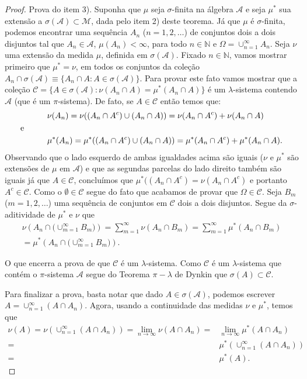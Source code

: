 \begin{proof}
Prova do item 3). 
Suponha que $ \mu$ seja $\sigma$-finita 
na álgebra $\mathcal{A}$ e seja
$\mu^*$ sua extensão a $\sigma(\mathcal{A}) \subset \mathcal{M}$, 
dada pelo item 2) deste teorema. Já que $\mu$ é $\sigma$-finita, podemos
encontrar uma sequência $A_n$ ($n=1,2,\ldots$) de conjuntos
dois a dois disjuntos tal que 
$A_n\in \mathcal{A}$, $\mu(A_n)<\infty$, para todo $n\in\mathbb{N}$ e 
$\Omega = \cup_{n=1}^{\infty} A_n$. 
Seja $\nu$ uma extensão da medida $\mu$, definida em $\sigma(\mathcal{A})$.
Fixado $n\in\mathbb{N}$, vamos mostrar primeiro que $\mu^{*} = \nu$, 
em todos os conjuntos da coleção 
$
A_n\cap \sigma(\mathcal{A}) \equiv \{ A_n\cap A: A\in\sigma(\mathcal{A})\}.
$
Para provar este fato vamos mostrar que a coleção 
$
\mathcal{C} = \{ A\in \sigma(\mathcal{A}) : \nu(A_n\cap A) = \mu^*(A_n\cap A)\}
$
é um $\lambda$-sistema contendo $\mathcal{A}$ (que é um $\pi$-sistema). 
De fato, se $A \in\mathcal{C}$ então temos que: 
\begin{align*}
	&\nu(A_n) =
	\nu((A_n\cap A^c) \cup (A_n\cap A)) 
	= 
	\nu(A_n\cap A^c)+ \nu(A_n\cap A)
\\
\text{e}\hspace*{1cm}&
\\
	&\mu^*(A_n) =
	\mu^*((A_n\cap A^c) \cup (A_n\cap A)) 
	= 
	\mu^*(A_n\cap A^c)+ \mu^*(A_n\cap A).
\end{align*}
Observando que o lado esquerdo de ambas igualdades acima são iguais
($\nu$ e $\mu^*$ são extensões de $\mu$ em $\mathcal{A}$) 
e que as segundas parcelas do lado direito também são iguais 
já que $A\in\mathcal{C}$, concluímos que $\mu^*((A_n\cap A^c)= \nu(A_n\cap A^c)$ 
e portanto $A^c\in\mathcal{C}$. 
Como o $\emptyset\in\mathcal{C}$ segue do fato que acabamos de provar que
$\Omega\in\mathcal{C}$. 
Seja $B_m$ ($m=1,2,\ldots$) uma sequência de conjuntos em 
$\mathcal{C}$ dois a dois disjuntos. Segue da $\sigma$-aditividade
de $\mu^*$ e $\nu$ que 
\begin{multline*}
\nu\left( A_n \cap \big(\cup_{m=1}^{\infty}B_m\big) \right)
=
\sum_{m=1}^{\infty} \nu\left( A_n \cap B_m \right)
=
\sum_{m=1}^{\infty} \mu^*\left( A_n \cap B_m \right)
\\
=
\mu^*\left( A_n \cap \big(\cup_{m=1}^{\infty}B_m\big) \right).
\end{multline*}

O que encerra a prova de que $\mathcal{C}$ é um $\lambda$-sistema.
Como $\mathcal{C}$ é um $\lambda$-sistema que contém o $\pi$-sistema
$\mathcal{A}$ segue do Teorema $\pi-\lambda$ de Dynkin que 
$\sigma(A)\subset \mathcal{C}$.


Para finalizar a prova, basta notar que dado $A\in \sigma(\mathcal{A})$, 
podemos escrever
$A=\cup_{n=1}^{\infty} (A\cap A_n)$.
Agora, usando a continuidade das medidas $\nu$ e $\mu^*$,
temos que  
\begin{align*}
\nu(A) = \nu\left( \cup_{n=1}^{\infty} (A\cap A_n) \right)
	   = \lim_{n\to\infty} \nu(A\cap A_n)
	   =& \lim_{n\to\infty} \mu^{*}(A\cap A_n)
	   \\[0.2cm]
	   =& \mu^*( \cup_{n=1}^{\infty} (A\cap A_n) )
	   \\[0.2cm]
	   =& \mu^*(A).
\end{align*}
\end{proof}

